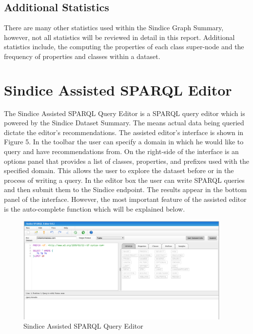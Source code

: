 \documentclass[11pt,onecolumn]{article}
\begin{document}
\subsection{Additional Statistics}
There are many other statistics used within the Sindice Graph Summary, however, not all statistics will be reviewed in detail in this report.  Additional statistics include, the computing the properties of each class super-node and the frequency of properties and classes within a dataset. 



\section{Sindice Assisted SPARQL Editor}
The Sindice Assisted SPARQL Query Editor is a SPARQL query editor which is powered by the Sindice Dataset Summary. The means actual data being queried dictate the editor's recommendations. The assisted editor's interface is shown in Figure 5.  In the toolbar the user can specify a domain in which he would like to query and have recommendations from.  On the right-side of the interface is an options panel that provides a list of classes, properties, and prefixes used with the specified domain.  This allows the user to explore the dataset before or in the process of writing a query.  In the editor box the user can write SPARQL queries and then submit them to the Sindice endpoint.  The results appear in the bottom panel of the interface.  However, the most important feature of the assisted editor is the auto-complete function which will be explained below. 

\begin{figure}
  \centering
    \includegraphics[width=0.95\textwidth]{flint-editor.png}
    \caption{Sindice Assisted SPARQL Query Editor}
\end{figure}
\end{document}

